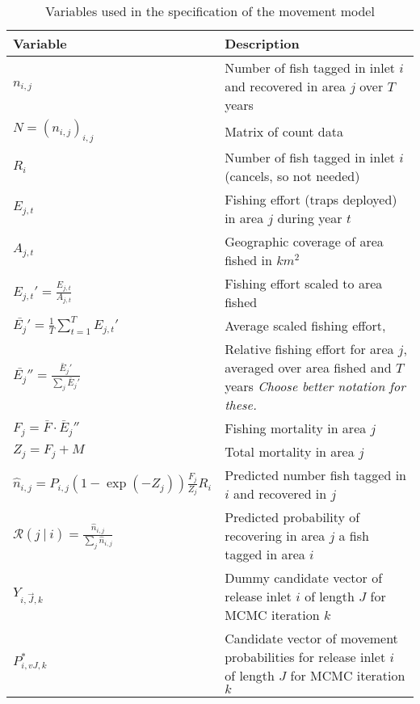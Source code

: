 \documentclass[12pt]{article}
\newcommand{\vJ}{\vec{J}}
\newcommand{\cR}{\mathcal{R}}
\begin{document}
\begin{table}[!h]
\begin{center}
\begin{tabular}{ p{15em} | p{25em}}

\hline
Variable & Description \\
\hline
$ n_{i,j} $ & Number of fish tagged in inlet $i$ and recovered in area $j$ over $T$ years \\
$N = (n_{i,j})_{i,j}$ & Matrix of count data  \\
$R_i$ & Number of fish tagged in inlet $i$ (cancels, so not needed) \\
$E_{j,t}$ & Fishing effort (traps deployed) in area $j$ during year $t$ \\
$A_{j,t}$ & Geographic coverage of area fished in $km^2$ \\
$E_{j,t}' = \frac{E_{j,t}}{A_{j,t}}$ & Fishing effort scaled to area fished  \\
$\bar{E_j}' = \frac1T\sum_{t = 1}^T E_{j,t}'$ & Average scaled fishing effort,  \\
$\bar{E_j}'' = \frac{\bar{E}_j'}{\sum_{j}\bar{E}_j'}$ & Relative fishing effort for area $j$, averaged over area fished and $T$ years {\it \color{red} Choose better notation for these.} \\
$ F_j = \bar{F} \cdot \bar{E}_j''$ & Fishing mortality in area $j$ \\
$Z_j = F_j + M$ & Total mortality in area $j$\\
$\hat{n}_{i,j} = P_{i,j} \left(1 - \exp(-Z_j) \right)\frac{F_j}{Z_j}R_i$ & Predicted number fish tagged in $i$ and recovered in $j$ \\
$\cR(j~|~i) = \frac{\hat{n}_{i,j}}{\sum_j \hat{n}_{i,j}}$ & Predicted probability of recovering in area $j$ a fish tagged in area $i$ \\
$Y_{i,\vJ,k}$ & Dummy candidate vector of release inlet $i$ of length $J$ for MCMC iteration $k$ \\
$ P^*_{i,vJ,k} $ & Candidate vector of movement probabilities for release inlet $i$ of length $J$ for MCMC iteration $k$ \\

\hline
\end{tabular}
\caption{Variables used in the specification of the movement model}\label{tab:variables}
\end{center}
\end{table}
\end{document}
